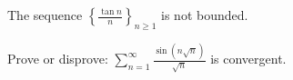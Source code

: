 \documentclass{article}
\begin{document}
\begin{problem}{}
    The sequence $\displaystyle \left\{ \frac{\tan n}{n} \right\}_{n \geq 1}$ is not bounded. 
\end{problem}
\vspace{l}
\begin{problem}{}
    Prove or disprove: $\displaystyle \sum_{n = 1}^\infty \frac{\sin (n \sqrt{n})}{\sqrt{n}}$ is convergent. 
\end{problem}
\end{document}
